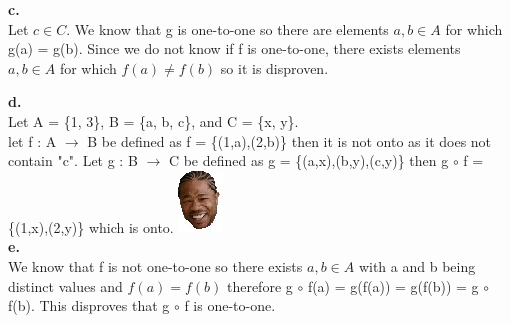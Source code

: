 \textbf{c.}\\
Let $c \in C$. We know that g is one-to-one so there are elements $a,b \in A$ for which g(a) = g(b). Since we do not know if f is one-to-one, there exists elements $a,b \in A$ for which $f(a) \neq f(b)$ so it is disproven.

\textbf{d.}\\
Let A = \{1, 3\}, B = \{a, b, c\}, and C = \{x, y\}.\\
let f : A $\rightarrow$ B be defined as f = \{(1,a),(2,b)\} then it is not onto as it does not contain "c". Let g : B $\rightarrow$ C be defined as g = \{(a,x),(b,y),(c,y)\} then g $\circ$ f = \{(1,x),(2,y)\} which is onto.  \includegraphics[scale=0.70]{billeder/xzibit}\\

\textbf{e.}\\
We know that f is not one-to-one so there exists $a,b \in A$ with a and b being distinct values and $f(a) = f(b)$ therefore g $\circ$ f(a) = g(f(a)) = g(f(b)) = g $\circ$ f(b). This disproves that g $\circ$ f is one-to-one.\\

